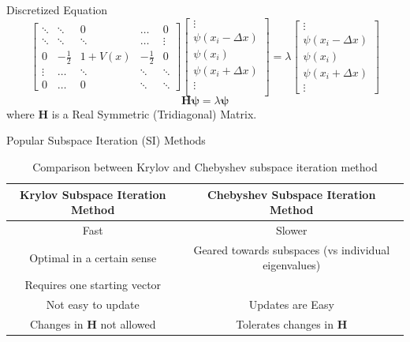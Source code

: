 \documentclass[serif, aspectratio=169]{beamer}
\begin{document}
\begin{frame}{Discretized Equation}
    \[
    \begin{bmatrix}
        \ddots & \ddots & 0 & \ldots & 0 \\
        \ddots & \ddots & \ddots & \ldots & \vdots \\
        0 & -\frac{1}{2} & 1+V(x) & -\frac{1}{2} & 0 \\
        \vdots & \ldots & \ddots & \ddots &\ddots  \\
        0 & \ldots & 0 & \ddots & \ddots 
    \end{bmatrix}
    \begin{bmatrix}
        \vdots \\
        \psi(x_i - \Delta x)\\
        \psi(x_i)\\
        \psi(x_i + \Delta x)\\
        \vdots \\
    \end{bmatrix}
    =\lambda \begin{bmatrix}
        \vdots \\
        \psi(x_i-\Delta x)\\
        \psi(x_i)\\
        \psi(x_i+\Delta x) \\
        \vdots
    \end{bmatrix}
    \]
    \[
    \mathbf{H \psi}=\lambda\mathbf{\psi}
    \]
    where $\mathbf{H}$ is a Real Symmetric (Tridiagonal) Matrix.
\end{frame}

\begin{frame}{Popular Subspace Iteration (SI) Methods}
    
    \begin{table}
        \centering
        \begin{tabular}{|c|c|}
            Krylov Subspace Iteration Method & Chebyshev Subspace Iteration Method\\
            \hline
            Fast & Slower\\
            Optimal in a certain sense & Geared towards subspaces (vs individual eigenvalues) \\
            Requires one starting vector & \\
            Not easy to update & Updates are Easy \\
            Changes in $\mathbf{H}$ not allowed & Tolerates changes in $\mathbf{H}$ \\
        \end{tabular}
        \caption{Comparison between Krylov and Chebyshev subspace iteration method}
        \label{tab:comp}
    \end{table}
\end{frame}
\end{document}
